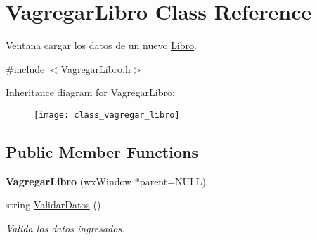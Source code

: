 \hypertarget{class_vagregar_libro}{}\section{Vagregar\+Libro Class Reference}
\label{class_vagregar_libro}


Ventana cargar los datos de un nuevo \hyperlink{class_libro}{Libro}.  




{\ttfamily \#include $<$Vagregar\+Libro.\+h$>$}

Inheritance diagram for Vagregar\+Libro\+:\begin{figure}[H]
\begin{center}
\leavevmode
\texttt{[image: class\_vagregar\_libro]}
\end{center}
\end{figure}
\subsection*{Public Member Functions}
\begin{DoxyCompactItemize}
\item 
{\bfseries Vagregar\+Libro} (wx\+Window $\ast$parent=N\+U\+LL)\hypertarget{class_vagregar_libro_a12b4b3824ebe3116d41ed34ffaeb64d9}{}\label{class_vagregar_libro_a12b4b3824ebe3116d41ed34ffaeb64d9}

\item 
string \hyperlink{class_vagregar_libro_a145e90663e920301404c478e932d80de}{Validar\+Datos} ()\hypertarget{class_vagregar_libro_a145e90663e920301404c478e932d80de}{}\label{class_vagregar_libro_a145e90663e920301404c478e932d80de}

\begin{DoxyCompactList}\small\item\em Valida los datos ingresados. \end{DoxyCompactList}\end{DoxyCompactItemize}
